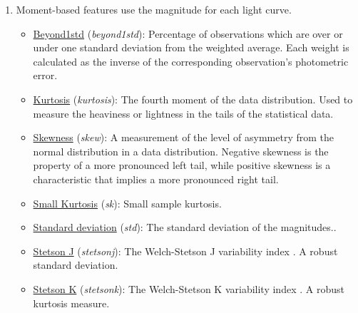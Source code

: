 \documentclass[a4paper,fleqn,usenatbib]{mnras}
\begin{document}
\begin{enumerate}
    
\item Moment-based features use the magnitude for each light curve.
  \begin{itemize}
  \item \underline{Beyond1std} (\textit{beyond1std}): 
    Percentage of observations which are over or under one standard
    deviation from the weighted average. Each weight is calculated as
    the inverse of the corresponding observation's photometric error. 
        \item \underline{Kurtosis} (\textit{kurtosis}): 
        The fourth moment of the data distribution. Used to measure
        the heaviness or lightness in the tails of the statistical
        data. 
        \item \underline{Skewness} (\textit{skew}): 
        A measurement of the level of asymmetry from the normal
        distribution in a data distribution. Negative skewness is the
        property of a more pronounced left tail, while positive
        skewness is a characteristic that implies a more pronounced
        right tail. 
        \item \underline{Small Kurtosis} (\textit{sk}):
        Small sample kurtosis.
        \item \underline{Standard deviation} (\textit{std}):
        The standard deviation of the magnitudes..
        \item \underline{Stetson J} (\textit{stetson\textunderscore j}):
        The Welch-Stetson J variability index
        \cite{1996PASP..108..851S}. A robust standard deviation. 
        \item \underline{Stetson K} (\textit{stetson\textunderscore k}): 
        The Welch-Stetson K variability index
        \cite{1996PASP..108..851S}. A robust kurtosis measure. 
    \end{itemize}
    

\end{enumerate}
\end{document}
